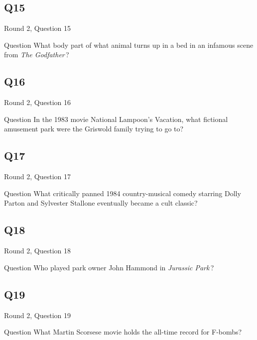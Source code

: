 \documentclass[11pt]{beamer}
\begin{document}
\subsection*{Q15}
\begin{frame}[t]{Round 2, Question 15}
\vspace{2em}
\begin{block}{Question}
What body part of what animal turns up in a bed in an infamous scene from \emph{The Godfather}\,?
\end{block}
\end{frame}
    

\subsection*{Q16}
\begin{frame}[t]{Round 2, Question 16}
\vspace{2em}
\begin{block}{Question}
In the 1983 movie National Lampoon's Vacation, what fictional amusement park were the Griswold family trying to go to?
\end{block}
\end{frame}
    

\subsection*{Q17}
\begin{frame}[t]{Round 2, Question 17}
\vspace{2em}
\begin{block}{Question}
What critically panned 1984 country-musical comedy starring Dolly Parton and Sylvester Stallone eventually became a cult classic?
\end{block}
\end{frame}
    

\subsection*{Q18}
\begin{frame}[t]{Round 2, Question 18}
\vspace{2em}
\begin{block}{Question}
Who played park owner John Hammond in \emph{Jurassic Park}\,?
\end{block}
\end{frame}
    

\subsection*{Q19}
\begin{frame}[t]{Round 2, Question 19}
\vspace{2em}
\begin{block}{Question}
What Martin Scorsese movie holds the all-time record for F-bombs?
\end{block}
\end{frame}
    
\end{document}
